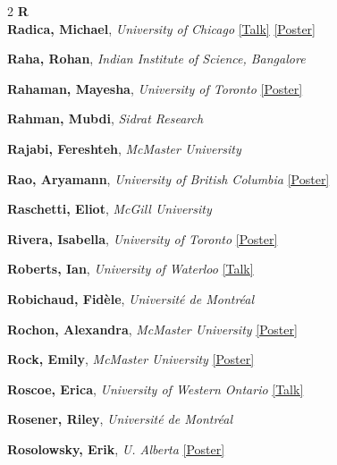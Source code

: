 \begin{small}
\begin{multicols}{2}
{\sffamily\bfseries\color{cascablue}\large R}\\[2pt]

\textbf{Radica, Michael}, {\footnotesize\textit{University of Chicago}} \hyperref[abstract-page-talk-2]{\scriptsize\textcolor{cascablue}{[Talk]}} \hyperref[poster-abstract-page-talk-1]{\scriptsize\textcolor{cascateal}{[Poster]}}\par
\textbf{Raha, Rohan}, {\footnotesize\textit{Indian Institute of Science, Bangalore}}\par
\textbf{Rahaman, Mayesha}, {\footnotesize\textit{University of Toronto}} \hyperref[poster-abstract-page-talk-153]{\scriptsize\textcolor{cascateal}{[Poster]}}\par
\textbf{Rahman, Mubdi}, {\footnotesize\textit{Sidrat Research}}\par
\textbf{Rajabi, Fereshteh}, {\footnotesize\textit{McMaster University}}\par
\textbf{Rao, Aryamann}, {\footnotesize\textit{University of British Columbia}} \hyperref[poster-abstract-page-talk-59]{\scriptsize\textcolor{cascateal}{[Poster]}}\par
\textbf{Raschetti, Eliot}, {\footnotesize\textit{McGill University}}\par
\textbf{Rivera, Isabella}, {\footnotesize\textit{University of Toronto}} \hyperref[poster-abstract-page-talk-247]{\scriptsize\textcolor{cascateal}{[Poster]}}\par
\textbf{Roberts, Ian}, {\footnotesize\textit{University of Waterloo}} \hyperref[abstract-page-talk-178]{\scriptsize\textcolor{cascablue}{[Talk]}}\par
\textbf{Robichaud, Fidèle}, {\footnotesize\textit{Université de Montréal}}\par
\textbf{Rochon, Alexandra}, {\footnotesize\textit{McMaster University}} \hyperref[poster-abstract-page-talk-253]{\scriptsize\textcolor{cascateal}{[Poster]}}\par
\textbf{Rock, Emily}, {\footnotesize\textit{McMaster University}} \hyperref[poster-abstract-page-talk-236]{\scriptsize\textcolor{cascateal}{[Poster]}}\par
\textbf{Roscoe, Erica}, {\footnotesize\textit{University of Western Ontario}} \hyperref[abstract-page-talk-289]{\scriptsize\textcolor{cascablue}{[Talk]}}\par
\textbf{Rosener, Riley}, {\footnotesize\textit{Université de Montréal}}\par
\textbf{Rosolowsky, Erik}, {\footnotesize\textit{U. Alberta}} \hyperref[poster-abstract-page-talk-258]{\scriptsize\textcolor{cascateal}{[Poster]}}\par

\end{multicols}
\end{small}
